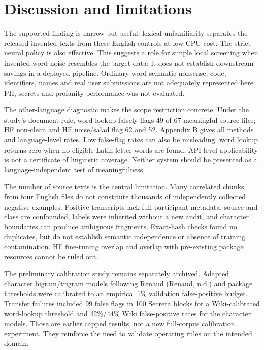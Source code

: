 \documentclass[10pt,a4paper,twocolumn]{article}
\begin{document}
\section{Discussion and limitations}\label{discussion-and-limitations}

The supported finding is narrow but useful: lexical unfamiliarity
separates the released invented texts from these English controls at low
CPU cost. The strict neural policy is also effective. This suggests a
role for simple local screening when invented-word noise resembles the
target data; it does not establish downstream savings in a deployed
pipeline. Ordinary-word semantic nonsense, code, identifiers, names and
real user submissions are not adequately represented here. PII, secrets
and profanity performance was not evaluated.

The other-language diagnostic makes the scope restriction concrete.
Under the study's document rule, word lookup falsely flags 49 of 67
meaningful source files; HF non-clean and HF noise/salad flag 62 and 52.
Appendix B gives all methods and language-level rates. Low false-flag
rates can also be misleading: word lookup returns zero when no eligible
Latin-letter words are found. API-level applicability is not a
certificate of linguistic coverage. Neither system should be presented
as a language-independent test of meaningfulness.

The number of source texts is the central limitation. Many correlated
chunks from four English files do not constitute thousands of
independently collected negative examples. Positive transcripts lack
full participant metadata, source and class are confounded, labels were
inherited without a new audit, and character boundaries can produce
ambiguous fragments. Exact-hash checks found no duplicates, but do not
establish semantic independence or absence of training contamination. HF
fine-tuning overlap and overlap with pre-existing package resources
cannot be ruled out.

The preliminary calibration study remains separately archived. Adapted
character bigram/trigram models following Renaud (Renaud, n.d.) and
package thresholds were calibrated to an empirical 1\% validation
false-positive budget. Transfer failures included 99 false flags in 100
Secreta blocks for a Wiki-calibrated word-lookup threshold and 42\%/44\%
Wiki false-positive rates for the character models. Those are earlier
capped results, not a new full-corpus calibration experiment. They
reinforce the need to validate operating rules on the intended domain.
\end{document}
